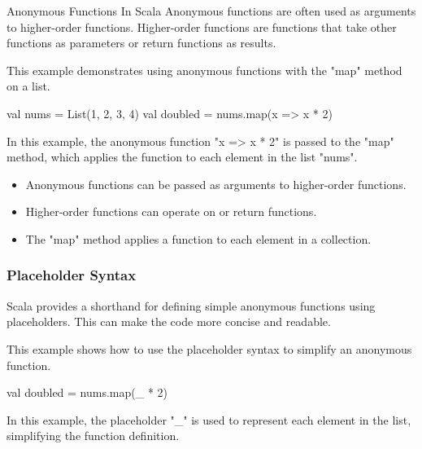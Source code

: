 \begin{notes}{Anonymous Functions In Scala}
    Anonymous functions are often used as arguments to higher-order functions. Higher-order functions are functions that take other functions as parameters or return functions as results.
    
    \begin{highlight}
    
        This example demonstrates using anonymous functions with the "map" method on a list.
    
    \begin{code}[Scala]
    val nums = List(1, 2, 3, 4)
    val doubled = nums.map(x => x * 2)
    \end{code}
    
        In this example, the anonymous function "x => x * 2" is passed to the "map" method, which applies the function to each element in the list "nums".
        
        \begin{itemize}
            \item Anonymous functions can be passed as arguments to higher-order functions.
            \item Higher-order functions can operate on or return functions.
            \item The "map" method applies a function to each element in a collection.
        \end{itemize}
    
    \end{highlight}
    
    \subsubsection*{Placeholder Syntax}
    
        Scala provides a shorthand for defining simple anonymous functions using placeholders. This can make the code more concise and readable.
    
    \begin{highlight}
    
        This example shows how to use the placeholder syntax to simplify an anonymous function.
    
    \begin{code}[Scala]
    val doubled = nums.map(_ * 2)
    \end{code}
    
        In this example, the placeholder "\_" is used to represent each element in the list, simplifying the function definition.
    

\end{highlight}
\end{notes}
